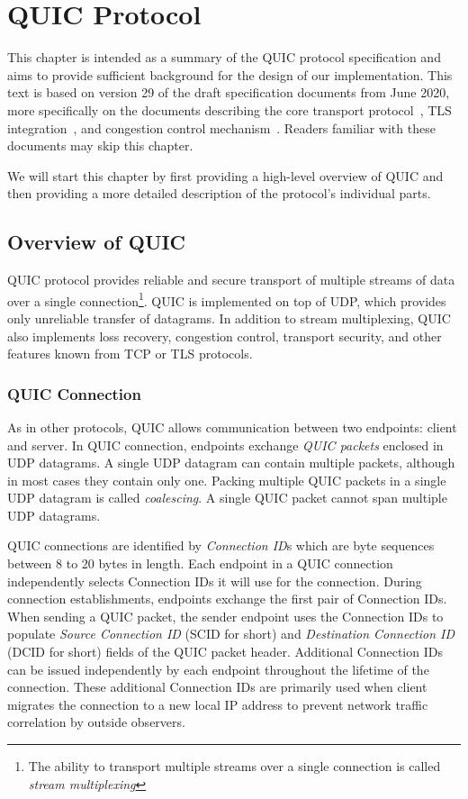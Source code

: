 \chapter{QUIC Protocol}\label{chap:02-quic}

This chapter is intended as a summary of the QUIC protocol specification and aims to provide
sufficient background for the design of our implementation. This text is based on version 29 of the
draft specification documents from June 2020, more specifically on the documents describing the core
transport protocol~\cite{draft-ietf-quic-transport}, TLS integration~\cite{draft-ietf-quic-tls}, and
congestion control mechanism~\cite{draft-ietf-quic-recovery}. Readers familiar with these documents
may skip this chapter.

We will start this chapter by first providing a high-level overview of QUIC and then providing a
more detailed description of the protocol's individual parts.

\section{Overview of QUIC}

QUIC protocol provides reliable and secure transport of multiple streams of data over a single
connection\footnote{The ability to transport multiple streams over a single connection is called
\textit{stream multiplexing}}. QUIC is implemented on top of UDP, which provides only unreliable
transfer of datagrams. In addition to stream multiplexing, QUIC also implements loss recovery,
congestion control, transport security, and other features known from TCP or TLS protocols.

\subsection{QUIC Connection}

As in other protocols, QUIC allows communication between two endpoints: client and server. In QUIC
connection, endpoints exchange \textit{QUIC packets} enclosed in UDP datagrams. A single UDP
datagram can contain multiple packets, although in most cases they contain only one. Packing
multiple QUIC packets in a single UDP datagram is called \textit{coalescing}. A single QUIC packet
cannot span multiple UDP datagrams.

QUIC connections are identified by \textit{Connection ID}s which are byte sequences between 8 to 20
bytes in length. Each endpoint in a QUIC connection independently selects Connection IDs it will use
for the connection. During connection establishments, endpoints exchange the first pair of
Connection IDs. When sending a QUIC packet, the sender endpoint uses the Connection IDs to populate
\textit{Source Connection ID} (SCID for short) and \textit{Destination Connection ID} (DCID for
short) fields of the QUIC packet header. Additional Connection IDs can be issued independently by
each endpoint throughout the lifetime of the connection. These additional Connection IDs are
primarily used when client migrates the connection to a new local IP address to prevent network
traffic correlation by outside observers.

